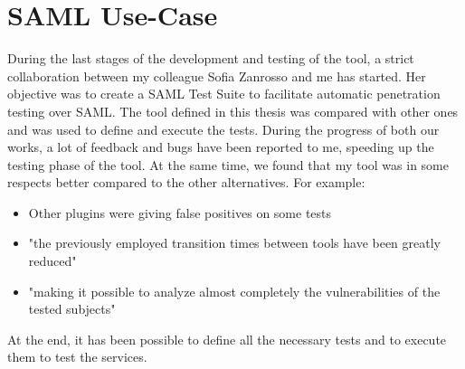 \section{SAML Use-Case}
During the last stages of the development and testing of the tool, a strict collaboration between my colleague Sofia Zanrosso and me has started. Her objective was to create a \gls{SAML} Test Suite to facilitate automatic penetration testing over \gls{SAML}\cite{sofia_zanrosso}. The tool defined in this thesis was compared with other ones and was used to define and execute the tests. During the progress of both our works, a lot of feedback and bugs have been reported to me, speeding up the testing phase of the tool. At the same time, we found that my tool was in some respects better compared to the other alternatives. For example:
\begin{itemize}
    \item Other plugins were giving false positives on some tests
    \item "the previously employed transition times between tools have been greatly reduced"
    \item "making it possible to analyze almost completely the vulnerabilities of the tested subjects"
\end{itemize}
At the end, it has been possible to define all the necessary tests and to execute them to test the services.






